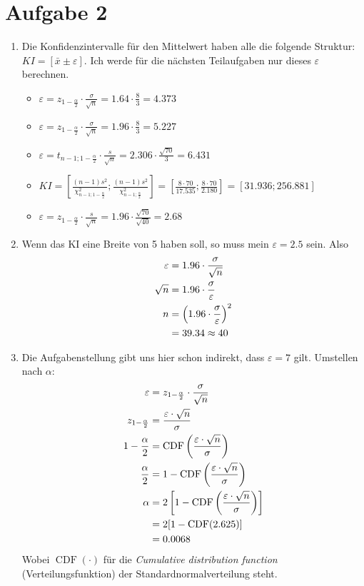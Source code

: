 \documentclass{article}
\DeclareMathOperator{\CDF}{CDF}
\begin{document}
	\section*{Aufgabe 2}
	\begin{enumerate}[label=(\alph*)]
		\item Die Konfidenzintervalle für den Mittelwert haben alle die folgende Struktur: $KI = [\bar{x} \pm \varepsilon]$. Ich werde für die nächsten Teilaufgaben nur dieses $\varepsilon$ berechnen.
		\begin{itemize}
			\item $\varepsilon = z_{1-\frac{\alpha}{2}}\cdot\frac{\sigma}{\sqrt{n}} = 1.64\cdot\frac{8}{3} = 4.373$
			\item $\varepsilon = z_{1-\frac{\alpha}{2}}\cdot\frac{\sigma}{\sqrt{n}} = 1.96\cdot\frac{8}{3} = 5.227$
			\item $\varepsilon = t_{n-1;1-\frac{\alpha}{2}}\cdot\frac{s}{\sqrt{n}} = 2.306\cdot\frac{\sqrt{70}}{3} = 6.431$
			\item $KI = \left[\frac{(n-1)s^2}{\chi_{n-1;1-\frac{\alpha}{2}}^2};\frac{(n-1)s^2}{\chi_{n-1;\frac{\alpha}{2}}^2}\right] = \left[\frac{8\cdot 70}{17.535};\frac{8\cdot 70}{2.180}\right] = [31.936;256.881]$
			\item $\varepsilon = z_{1-\frac{\alpha}{2}}\cdot\frac{s}{\sqrt{n}} = 1.96\cdot\frac{\sqrt{70}}{\sqrt{40}} = 2.68$
		\end{itemize}
		\item Wenn das KI eine Breite von 5 haben soll, so muss mein $\varepsilon=2.5$ sein. Also
		\begin{align}
			\varepsilon &= 1.96 \cdot\frac{\sigma}{\sqrt{n}} \notag \\
			\sqrt{n} &= 1.96\cdot\frac{\sigma}{\varepsilon} \notag \\
			n &= \left(1.96\cdot\frac{\sigma}{\varepsilon}\right)^2 \notag \\
			&= 39.34 \approx 40 \notag
		\end{align}
		\item Die Aufgabenstellung gibt uns hier schon indirekt, dass $\varepsilon = 7$ gilt. Umstellen nach $\alpha$:
		\begin{align}
			\varepsilon &= z_{1-\frac{\alpha}{2}} \cdot\frac{\sigma}{\sqrt{n}} \notag \\
			z_{1-\frac{\alpha}{2}} &= \frac{\varepsilon\cdot\sqrt{n}}{\sigma} \notag \\
			1-\frac{\alpha}{2} &= \CDF\left(\frac{\varepsilon\cdot\sqrt{n}}{\sigma}\right) \notag \\
			\frac{\alpha}{2} &= 1- \CDF\left(\frac{\varepsilon\cdot\sqrt{n}}{\sigma}\right) \notag \\
			\alpha &= 2\left[1-\CDF\left(\frac{\varepsilon\cdot\sqrt{n}}{\sigma}\right)\right] \notag \\
			&= 2[1-\CDF(2.625)] \notag \\
			&= 0.0068 \notag
		\end{align}
		Wobei $\CDF(\cdot)$ für die \textit{Cumulative distribution function} (Verteilungsfunktion) der Standardnormalverteilung steht.
	\end{enumerate}
	
\end{document}
